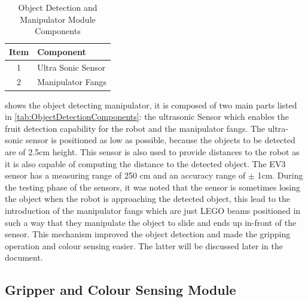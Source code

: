 \begin{table}[!ht]
	\centering
	\caption{Object Detection and Manipulator Module Components}
	\vspace{-2mm}
	\label{tab:ObjectDetectionComponents}
	\begin{tabular}{cl}
		\hline
		\textbf{Item}&\textbf{Component}\\
		\hline
		1&Ultra Sonic Sensor\\
		2&Manipulator Fangs\\
		\hline			
	\end{tabular}
\end{table}

\noindent {} shows the object detecting manipulator, it is composed of two main parts listed in \vref{tab:ObjectDetectionComponents}: the ultrasonic Sensor which enables the fruit detection capability for the robot and the manipulator fangs. The ultra-sonic sensor is positioned as low as possible, because the objects to be detected are of 2.5cm height. This sensor is also used to provide distances to the robot as it is also capable of computing the distance to the detected object. The EV3 sensor has a measuring range of 250 cm and an accuracy range of $\pm$ 1cm. During the testing phase of the sensors, it was noted that the sensor is sometimes losing the object when the robot is approaching the detected object, this lead to the introduction of the manipulator fangs which are just LEGO beams positioned in such a way that they manipulate the object to slide and ends up in-front of the sensor. This mechanism improved the object detection and made the gripping operation and colour sensing easier. The latter will be discussed later in the document.


\newpage
\subsection{Gripper and Colour Sensing Module}\label{sec:Gripper}

